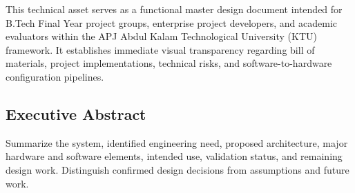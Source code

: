 This technical asset serves as a functional master design document intended for B.Tech Final Year project groups, enterprise project developers, and academic evaluators within the APJ Abdul Kalam Technological University (KTU) framework. It establishes immediate visual transparency regarding bill of materials, project implementations, technical risks, and software-to-hardware configuration pipelines.

\newpage

\subsection{Executive Abstract}

Summarize the system, identified engineering need, proposed architecture, major hardware and software elements, intended use, validation status, and remaining design work. Distinguish confirmed design decisions from assumptions and future work.
